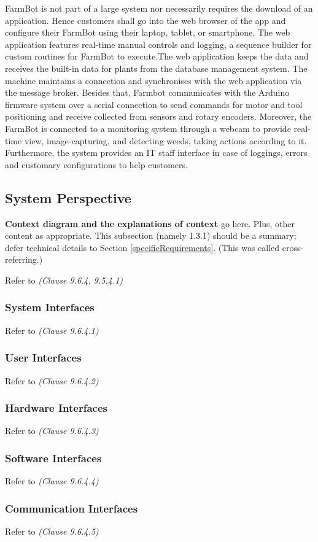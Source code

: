 FarmBot is not part of a large system nor necessarily requires the download of an application. Hence customers shall go into the web browser of the app and configure their FarmBot using their laptop, tablet, or smartphone.
The web application features real-time manual controls and logging, a sequence builder for custom routines for FarmBot to execute.The web application keeps the data and receives the built-in data for plants from the database management system. The machine maintains a connection and synchronises with the web application via the message broker. Besides that, Farmbot communicates with the Arduino firmware system over a serial connection to send commands for motor and tool positioning and receive collected from sensors and rotary encoders. Moreover, the FarmBot is connected to a monitoring system through a webcam to provide real-time view, image-capturing, and detecting weeds, taking actions according to it. Furthermore, the system provides an IT staff interface in case of loggings, errors and customary configurations to help customers.

\subsection{System Perspective}

\textbf{Context diagram and the explanations of context} go here. Plus, other content as appropriate. This subsection (namely 1.3.1) should be a summary; defer technical details to Section \ref{specificRequirements}. (This was called cross-referring.)

Refer to \textit{(Clause 9.6.4, 9.5.4.1)}
\subsubsection{System Interfaces}
Refer to \textit{(Clause 9.6.4.1)}
\subsubsection{User Interfaces}
Refer to \textit{(Clause 9.6.4.2)}
\subsubsection{Hardware Interfaces}
Refer to \textit{(Clause 9.6.4.3)}
\subsubsection{Software Interfaces}
Refer to \textit{(Clause 9.6.4.4)}
\subsubsection{Communication Interfaces}
Refer to \textit{(Clause 9.6.4.5)}
